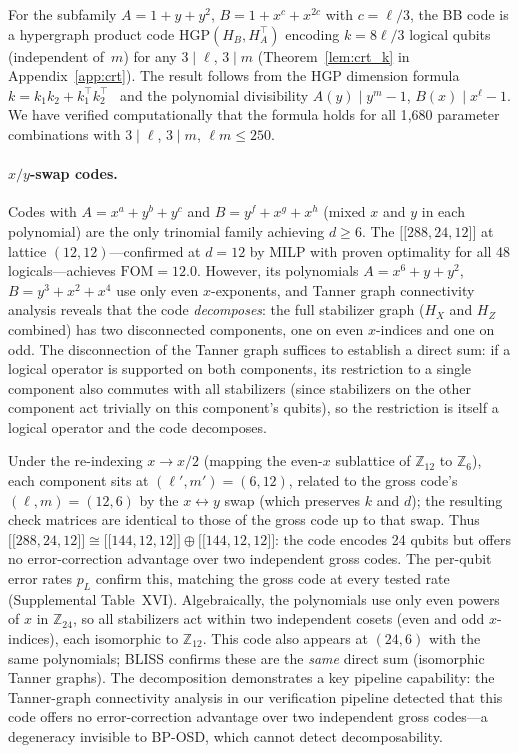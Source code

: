 \documentclass[aps,prxquantum,twocolumn,superscriptaddress,nofootinbib]{revtex4-2}
\newcommand{\ZZ}{\ensuremath{\mathbb{Z}}}
\newcommand{\dblbrk}[1]{\ensuremath{\lbrack\!\lbrack #1 \rbrack\!\rbrack}}
\newcommand{\code}[1]{\dblbrk{#1}}
\newcommand{\FOM}{\ensuremath{\mathrm{FOM}}}
\begin{document}
For the subfamily $A = 1{+}y{+}y^2$, $B = 1{+}x^c{+}x^{2c}$ with $c = \ell/3$, the BB code is a hypergraph product code $\mathrm{HGP}(H_B, H_A^\top)$ encoding $k = 8\ell/3$ logical qubits (independent of~$m$) for any $3 \mid \ell$, $3 \mid m$ (Theorem~\ref{lem:crt_k} in Appendix~\ref{app:crt}).
The result follows from the HGP dimension formula $k = k_1 k_2 + k_1^\top k_2^\top$~\cite{tillich2014quantum} and the polynomial divisibility $A(y) \mid y^m{-}1$, $B(x) \mid x^\ell{-}1$.
We have verified computationally that the formula holds for all 1{,}680 parameter combinations with $3 \mid \ell$, $3 \mid m$, $\ell m \leq 250$.

\paragraph{$x/y$-swap codes.}
Codes with $A = x^a {+} y^b {+} y^c$ and $B = y^f {+} x^g {+} x^h$ (mixed $x$ and $y$ in each polynomial) are the only trinomial family achieving $d \geq 6$.
The $\code{288,24,12}$ at lattice $(12,12)$---confirmed at $d = 12$ by MILP with proven optimality for all 48 logicals---achieves $\FOM = 12.0$.
However, its polynomials $A = x^6{+}y{+}y^2$, $B = y^3{+}x^2{+}x^4$ use only even $x$-exponents, and Tanner graph connectivity analysis reveals that the code \emph{decomposes}: the full stabilizer graph ($H_X$ and $H_Z$ combined) has two disconnected components, one on even $x$-indices and one on odd.
The disconnection of the Tanner graph suffices to establish a direct sum: if a logical operator is supported on both components, its restriction to a single component also commutes with all stabilizers (since stabilizers on the other component act trivially on this component's qubits), so the restriction is itself a logical operator and the code decomposes.

Under the re-indexing $x \to x/2$ (mapping the even-$x$ sublattice of $\ZZ_{12}$ to $\ZZ_6$), each component sits at $(\ell',m') = (6,12)$, related to the gross code's $(\ell,m) = (12,6)$ by the $x \leftrightarrow y$ swap (which preserves $k$ and $d$); the resulting check matrices are identical to those of the gross code up to that swap.
Thus $\code{288,24,12} \cong \code{144,12,12} \oplus \code{144,12,12}$: the code encodes 24 qubits but offers no error-correction advantage over two independent gross codes.
The per-qubit error rates $p_L$ confirm this, matching the gross code at every tested rate (Supplemental Table~XVI).
Algebraically, the polynomials use only even powers of $x$ in $\ZZ_{24}$, so all stabilizers act within two independent cosets (even and odd $x$-indices), each isomorphic to $\ZZ_{12}$.
This code also appears at $(24,6)$ with the same polynomials; BLISS confirms these are the \emph{same} direct sum (isomorphic Tanner graphs).
The decomposition demonstrates a key pipeline capability: the Tanner-graph connectivity analysis in our verification pipeline detected that this code offers no error-correction advantage over two independent gross codes---a degeneracy invisible to BP-OSD, which cannot detect decomposability.
\end{document}
